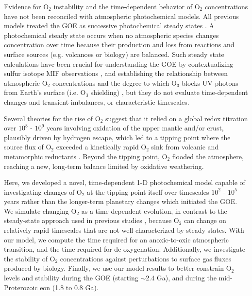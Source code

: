 Evidence for O$_2$ instability and the time-dependent behavior of O$_2$ concentrations have not been reconciled with atmospheric photochemical models. All previous models treated the GOE as successive photochemical steady states \citep{Kasting_1980,Segura_2003,Pavlov_2001,Pavlov_2002,Zahnle_2006,Bethan_2021,Claire_2014,Izon_2017,Kurzweil_2013}. A photochemical steady state occurs when no atmospheric species changes concentration over time because their production and loss from reactions and surface sources (e.g. volcanoes or biology) are balanced. Such steady state calculations have been crucial for understanding the GOE by contextualizing sulfur isotope MIF observations \citep{Pavlov_2002,Zahnle_2006}, and establishing the relationship between atmospheric O$_2$ concentrations and the degree to which O$_3$ blocks UV photons from Earth's surface (i.e. O$_3$ shielding) \citep{Kasting_1980,Pavlov_2001,Bethan_2021}, but they do not evaluate time-dependent changes and transient imbalances, or characteristic timescales.

Several theories for the rise of O$_2$ suggest that it relied on a global redox titration over $10^8$ - $10^9$ years involving oxidation of the upper mantle and/or crust, plausibly driven by hydrogen escape, which led to a tipping point where the source flux of O$_2$ exceeded a kinetically rapid O$_2$ sink from volcanic and metamorphic reductants \citep{Catling_2001,Claire_2006,Kadoya_2020,Holland_2002,Kasting_1993}. Beyond the tipping point, O$_2$ flooded the atmosphere, reaching a new, long-term balance limited by oxidative weathering. 

Here, we developed a novel, time-dependent 1-D photochemical model capable of investigating changes of O$_2$ at the tipping point itself over timescales $10^2$ - $10^5$ years rather than the longer-term planetary changes which initiated the GOE. We simulate changing O$_2$ as a time-dependent evolution, in contrast to the steady-state approach used in previous studies \citep[e.g.][]{Kasting_1980}, because O$_2$ can change on relatively rapid timescales that are not well characterized by steady-states. With our model, we compute the time required for an anoxic-to-oxic atmospheric transition, and the time required for de-oxygenation. Additionally, we investigate the stability of O$_2$ concentrations against perturbations to surface gas fluxes produced by biology. Finally, we use our model results to better constrain O$_2$ levels and stability during the GOE (starting $\sim 2.4$ Ga), and during the mid-Proterozoic eon (1.8 to 0.8 Ga).

